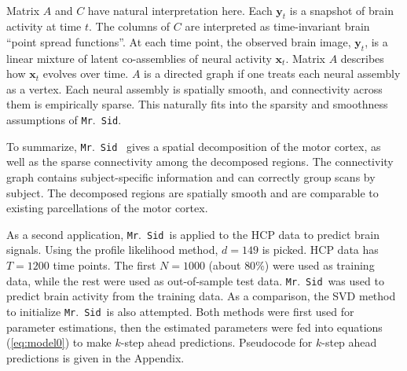 \documentclass[times,twocolumn,final,authoryear]{elsarticle}
\newcommand{\mrsid}{{\sc \texttt{Mr}.~\texttt{Sid}}}
\providecommand{\mb}[1]{\boldsymbol{#1}}
\newcommand{\bx}{\mb{x}}
\newcommand{\by}{\mb{y}}
\let\oldref\ref
\renewcommand{\ref}[1]{(\oldref{#1})}
\begin{document}
\begin{center}
\[\begin{array}{lll}
\end{array}
\]
\label{fig:3d}
\end{center}

Matrix $A$ and $C$ have natural interpretation here. Each $\by_t$ is a snapshot of brain activity at time $t$. The columns of $C$ are interpreted as time-invariant brain ``point spread functions''. At each time point, the observed brain image, $\by_t$, is a linear mixture of latent co-assemblies of neural activity  $\bx_t$. Matrix $A$ describes how $\bx_t$ evolves over time. $A$ is a directed graph if one treats each neural assembly as a vertex. Each neural assembly is spatially smooth, and connectivity across them is empirically sparse. This naturally fits into the sparsity and smoothness assumptions of \mrsid.

To summarize, \mrsid~ gives a spatial decomposition of the motor cortex, as well as the sparse connectivity among the decomposed regions. The connectivity graph contains subject-specific information and can correctly group scans by subject. The decomposed regions are spatially smooth and are comparable to existing parcellations of the motor cortex.

As a second application, \mrsid~is applied to the HCP data to predict brain signals.
Using the profile likelihood method, $d=149$ is picked. HCP data has $T=1200$ time points. The first $N = 1000$ (about $80\%$) were used as training data, while the rest were used as out-of-sample test data.
\mrsid~was used to predict brain activity from the training data. As a comparison, the SVD method to initialize \mrsid~is also attempted. Both methods were first used for parameter estimations, then the estimated parameters were fed into equations \ref{eq:model0} to make $k$-step ahead predictions. Pseudocode for $k$-step ahead predictions is given in the Appendix.
\end{document}
